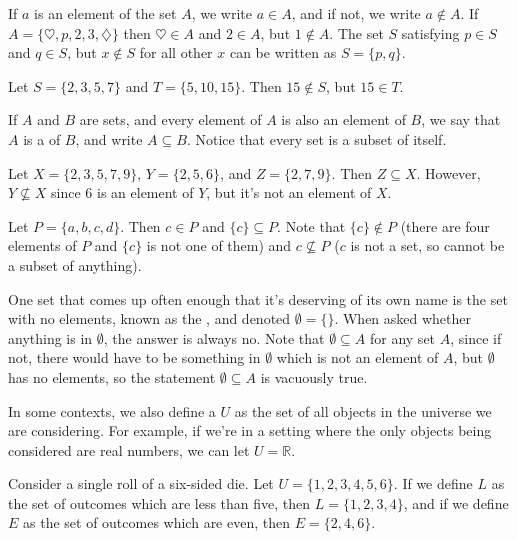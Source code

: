 If $a$ is an element of the set $A$, we write $a \in A$, and if not, we write $a \not\in A$. If $A = \{\heartsuit, p, 2, 3, \diamondsuit\}$ then $\heartsuit \in A$ and $2 \in A$, but $1 \not\in A$. The set $S$ satisfying $p \in S$ and $q \in S$, but $x \not\in S$ for all other $x$ can be written as $S = \{p,q\}$.

\begin{example}
Let $S = \{2,3,5,7\}$ and $T = \{5,10,15\}$. Then $15 \not\in S$, but $15 \in T$.
\end{example}

If $A$ and $B$ are sets, and every element of $A$ is also an element of $B$, we say that $A$ is a  of $B$, and write $A \subseteq B$. Notice that every set is a subset of itself.

\begin{example}
Let $X = \{2,3,5,7,9\}$, $Y = \{2,5,6\}$, and $Z = \{2,7,9\}$. Then $Z \subseteq X$. However, $Y \not\subseteq X$ since $6$ is an element of $Y$, but it's not an element of $X$.
\end{example}

\begin{example}
Let $P = \{a,b,c,d\}$. Then $c \in P$ and $\{c\} \subseteq P$. Note that $\{c\} \not \in P$ (there are four elements of $P$ and $\{c\}$ is not one of them) and $c \not\subseteq P$ ($c$ is not a set, so cannot be a subset of anything).
\end{example}

One set that comes up often enough that it's deserving of its own name is the set with no elements, known as the , and denoted $\emptyset = \{\}$. When asked whether anything is in $\emptyset$, the answer is always no. Note that $\emptyset \subseteq A$ for any set $A$, since if not, there would have to be something in $\emptyset$ which is not an element of $A$, but $\emptyset$ has no elements, so the statement $\emptyset \subseteq A$ is vacuously true.

In some contexts, we also define a  $U$ as the set of all objects in the universe we are considering. For example, if we're in a setting where the only objects being considered are real numbers, we can let $U = \mathbb{R}$.

\begin{example}
Consider a single roll of a six-sided die. Let $U = \{1,2,3,4,5,6\}$. If we define $L$ as the set of outcomes which are less than five, then $L = \{1,2,3,4\}$, and if we define $E$ as the set of outcomes which are even, then $E = \{2,4,6\}$.
\end{example}

